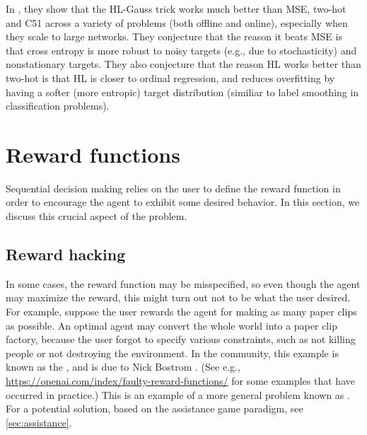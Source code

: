 In \citep{Farebrother2024}, they show that 
the HL-Gauss trick  works much better than
MSE,  two-hot and C51 across a variety of problems
(both offline and online),
especially  when they scale to large networks.
They conjecture that the reason it beats MSE
is that cross entropy is more robust to noisy targets
(e.g., due to stochasticity) and nonstationary targets.
They also conjecture  that the reason HL works better than two-hot
is that HL is closer to ordinal regression, and reduces overfitting
by having a softer (more entropic) target distribution
(similiar to label smoothing in classification problems).



\section{Reward functions}
\label{sec:reward}

Sequential decision making relies on the
 user to define the reward function in order to
 encourage the agent to exhibit some desired behavior.
In this section, we discuss this crucial aspect of the problem.


\subsection{Reward hacking}
\label{sec:rewardHacking}
\label{sec:hacking}

In some cases, the reward function may be misspecified, so even though the agent may
maximize the reward, this might turn out not to be what the user desired.
For example, suppose the user rewards the agent for making as many
paper clips as possible.
An optimal agent may convert the whole world into a paper clip factory,
because the user forgot to specify various constraints, such as not
killing people or not destroying the environment.
In the  community,
this example is known as  the ,
and is due to Nick Bostrom \citep{Bostrom2016}.
(See e.g., \url{https://openai.com/index/faulty-reward-functions/} for some examples
that have occurred in practice.)
This is an example of a more general problem
known as
\citep{Skalse2022}.
For a potential solution, based on the assistance game paradigm,
see \cref{sec:assistance}.



